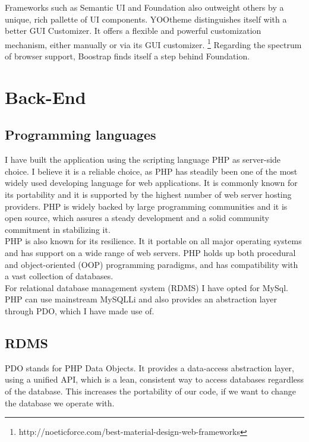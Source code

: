 Frameworks such as Semantic UI and Foundation also outweight others by a unique, rich pallette of UI components.
YOOtheme distinguishes itself with a better GUI Customizer. It offers a flexible and powerful customization mechanism, either manually or via its GUI customizer. \footnote{http://noeticforce.com/best-material-design-web-frameworks}
Regarding the spectrum of browser support, Boostrap finds itself a step behind Foundation.\\


\section{Back-End}

\subsection{Programming languages} 

I have built the application using the scripting language PHP as server-side choice. I believe it is a reliable choice, as PHP has steadily been one of the most widely used developing language for web applications. It is commonly known for its portability and it is supported by the highest number of web server hosting providers. 
PHP is widely backed by large programming communities and it is open source, which assures a steady development and a solid community commitment in stabilizing it.\\ 

PHP is also known for its resilience. It it portable on all major operating systems and has support on a wide range of web servers. PHP holds up both procedural and object-oriented (OOP) programming paradigms, and has compatibility with a vast collection of databases.\\ 

For relational database management system (RDMS) I have opted for MySql. PHP can use mainstream MySQLLi and also provides an abstraction layer through PDO, which I have made use of.

\subsection{RDMS} 

PDO stands for PHP Data Objects. It provides a data-access abstraction layer, using a unified API, which is a lean, consistent way to access databases regardless of the database. This increases the portability of our code, if we want to change the database we operate with.\\

